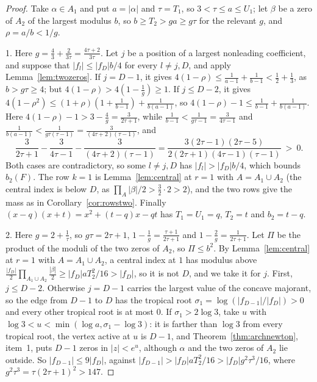 \documentclass[11pt]{article}
\begin{document}
\begin{proof}
Take $\alpha\in A_1$ and put $a=|\alpha|$ and $\tau=T_1$, so
$3<\tau\le a\le U_1$; let $\beta$ be a zero of $A_2$ of the largest modulus
$b$, so $b\ge T_2>ga\ge g\tau$ for the relevant $g$, and $\rho=a/b<1/g$.

1.  Here $g=\frac43+\frac2{3\tau}=\frac{4\tau+2}{3\tau}$.  Let $j$ be a
position of a largest nonleading coefficient, and suppose that
$|f_l|\le|f_D|b/4$ for every $l\ne j,D$, and apply
Lemma~\ref{lem:twozeros}.  If $j=D-1$, it gives
$4(1-\rho)\le\frac1{a-1}+\frac1{b-1}<\frac12+\frac13$, as $b>g\tau\ge4$;
but $4(1-\rho)>4(1-\frac1g)\ge1$.  If $j\le D-2$, it gives
$4(1-\rho^2)\le(1+\rho)(1+\frac1{b-1})+\frac1{b(a-1)}$, so
$4(1-\rho)-1\le\frac1{b-1}+\frac1{b(a-1)}$.  Here
$4(1-\rho)-1>3-\frac4g=\frac3{2\tau+1}$, while
$\frac1{b-1}<\frac1{g\tau-1}=\frac3{4\tau-1}$ and
$\frac1{b(a-1)}<\frac1{g\tau(\tau-1)}=\frac3{(4\tau+2)(\tau-1)}$, and
\[
  \frac3{2\tau+1}-\frac3{4\tau-1}-\frac3{(4\tau+2)(\tau-1)}
  =\frac{3(2\tau-1)(2\tau-5)}{2(2\tau+1)(4\tau-1)(\tau-1)}\ >\ 0 .
\]
Both cases are contradictory, so some $l\ne j,D$ has $|f_l|>|f_D|b/4$,
which bounds $b_2(F)$.  The row $k=1$ is Lemma~\ref{lem:central} at $r=1$
with $A=A_1\cup A_2$ (the central index is below $D$, as
$\prod_A|\beta|/2>\frac32\cdot2>2$), and the two rows give the mass as in
Corollary~\ref{cor:rowstwo}.  Finally $(x-q)(x+t)=x^2+(t-q)x-qt$ has
$T_1=U_1=q$, $T_2=t$ and $b_2=t-q$.

2.  Here $g=2+\frac1\tau$, so $g\tau=2\tau+1$, $1-\frac1g=\frac{\tau+1}{2\tau+1}$
and $1-\frac2g=\frac1{2\tau+1}$.  Let $\Pi$ be the product of the moduli of
the two zeros of $A_2$, so $\Pi\le b^2$.  By Lemma~\ref{lem:central} at $r=1$
with $A=A_1\cup A_2$, a central index at $1$ has modulus above
$\frac{|f_D|}2\prod_{A_1\cup A_2}\frac{|\beta|}2\ge|f_D|aT_2^2/16>|f_D|$, so
it is not $D$, and we take it for $j$.  First, $j\le D-2$.  Otherwise
$j=D-1$ carries the largest value of the concave majorant, so the edge from
$D-1$ to $D$ has the tropical root $\sigma_1=\log(|f_{D-1}|/|f_D|)>0$ and
every other tropical root is at most $0$.  If $\sigma_1>2\log3$, take $u$
with $\log3<u<\min(\log a,\sigma_1-\log3)$: it is farther than $\log3$ from
every tropical root, the vertex active at $u$ is $D-1$, and
Theorem~\ref{thm:archnewton}, item~1, puts $D-1$ zeros in $|z|<e^u$,
although $\alpha$ and the two zeros of $A_2$ lie outside.  So
$|f_{D-1}|\le9|f_D|$, against
$|f_{D-1}|>|f_D|aT_2^2/16>|f_D|g^2\tau^3/16$, where
$g^2\tau^3=\tau(2\tau+1)^2>147$.


\end{proof}
\end{document}
